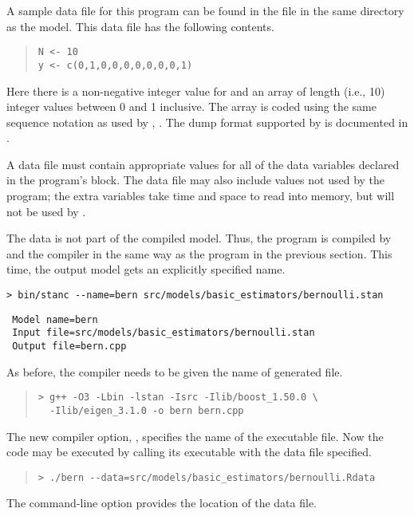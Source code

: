 A sample data file for this program can be found in the file
 in the same directory as the model.  This data file has
the following contents.
%
\begin{quote}
\begin{Verbatim}
N <- 10
y <- c(0,1,0,0,0,0,0,0,0,1)
\end{Verbatim}
\end{quote}
%
Here there
is a non-negative integer value for  and an array of length
 (i.e., 10) integer values between 0 and 1 inclusive.  The
array is coded using the same sequence notation as used by \R,  .
The dump format supported by \Stan is documented in .

A data file must contain appropriate values for all of the data
variables declared in the \Stan program's  block.  The data
file may also include values not used by the \Stan program; the extra
variables take time and space to read into memory, but will not be
used by \Stan.

The data is not part of the compiled model.  Thus, the \Stan program
is compiled by \stanc and the \Cpp compiler in the same way as the
program in the previous section.  This time, the output model gets an
explicitly specified name.
%
%
\begin{center}
\begin{Verbatim}[fontshape=sl]
 > bin/stanc --name=bern src/models/basic_estimators/bernoulli.stan 
\end{Verbatim}
\begin{Verbatim}
 Model name=bern
 Input file=src/models/basic_estimators/bernoulli.stan
 Output file=bern.cpp
\end{Verbatim}
\end{center}
%
As before, the \Cpp compiler needs to be given the name of
generated file.
%
\begin{quote}
\begin{Verbatim}[fontshape=sl]
> g++ -O3 -Lbin -lstan -Isrc -Ilib/boost_1.50.0 \
  -Ilib/eigen_3.1.0 -o bern bern.cpp
\end{Verbatim}
\end{quote}
%
The new compiler option, , specifies the name of the
executable file.  Now the code may be executed by calling its
executable with the data file specified.
%
\begin{quote}
\begin{Verbatim}[fontshape=sl]
> ./bern --data=src/models/basic_estimators/bernoulli.Rdata
\end{Verbatim}
\end{quote}
%
The command-line option  provides the location of the
data file.


